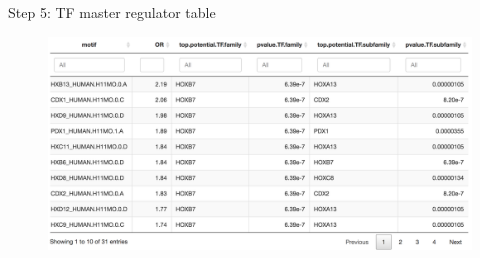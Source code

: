 \documentclass[slidestop,compress,11pt,xcolor=dvipsnames]{beamer}
\begin{document}


\begin{frame}{Step 5: TF master regulator table}
 \begin{figure}
  \centering
  \includegraphics[width=1.0\linewidth]{ELMER/TF_tbl.png}
 \end{figure}
\end{frame}
\end{document}
